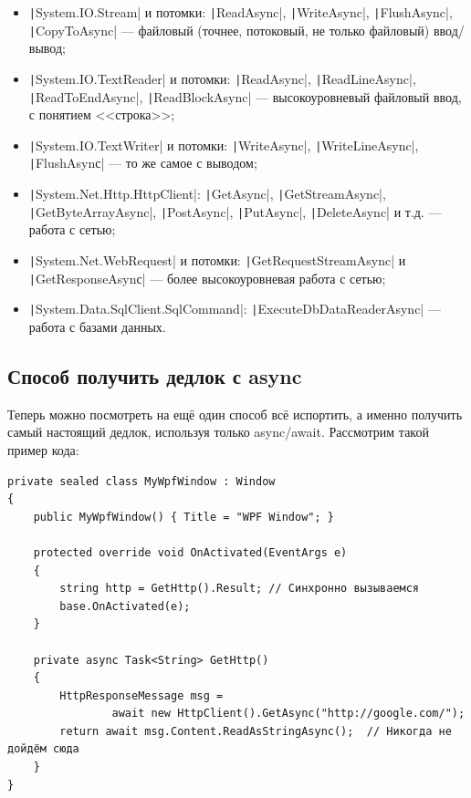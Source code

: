 \documentclass{../../text-style}
\begin{document}
\begin{itemize}
    \item \texttt|System.IO.Stream| и потомки: \texttt|ReadAsync|, \texttt|WriteAsync|, \texttt|FlushAsync|, \texttt|CopyToAsync| --- файловый (точнее, потоковый, не только файловый) ввод/вывод;
    \item \texttt|System.IO.TextReader| и потомки: \texttt|ReadAsync|, \texttt|ReadLineAsync|, \texttt|ReadToEndAsync|, \texttt|ReadBlockAsync| --- высокоуровневый файловый ввод, с понятием <<строка>>;
    \item \texttt|System.IO.TextWriter| и потомки: \texttt|WriteAsync|, \texttt|WriteLineAsync|, \texttt|FlushAsynс| --- то же самое с выводом;
    \item \texttt|System.Net.Http.HttpClient|: \texttt|GetAsync|, \texttt|GetStreamAsync|, \texttt|GetByteArrayAsync|, \texttt|PostAsync|, \texttt|PutAsync|, \texttt|DeleteAsync| и т.д. --- работа с сетью;
    \item \texttt|System.Net.WebRequest| и потомки: \texttt|GetRequestStreamAsync| и \texttt|GetResponseAsynс| --- более высокоуровневая работа с сетью;
    \item \texttt|System.Data.SqlClient.SqlCommand|: \texttt|ExecuteDbDataReaderAsync| --- работа с базами данных.
\end{itemize}

\subsection{Способ получить дедлок с async}

Теперь можно посмотреть на ещё один способ всё испортить, а именно получить самый настоящий дедлок, используя только async/await. Рассмотрим такой пример кода:

\begin{verbatim}
private sealed class MyWpfWindow : Window 
{
    public MyWpfWindow() { Title = "WPF Window"; }

    protected override void OnActivated(EventArgs e) 
    {
        string http = GetHttp().Result; // Синхронно вызываемся
        base.OnActivated(e);
    }

    private async Task<String> GetHttp() 
    {
        HttpResponseMessage msg = 
                await new HttpClient().GetAsync("http://google.com/");
        return await msg.Content.ReadAsStringAsync();  // Никогда не дойдём сюда
    }
}
\end{verbatim}
\end{document}
